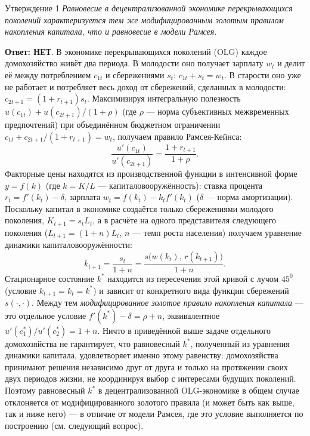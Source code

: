 \documentclass[10pt,a4paper]{article}
\newcommand{\qnet}{\textbf{\color{nored}Ответ: НЕТ}}
\newenvironment{answer}[2]{%
  \begin{qbox}{Утверждение #1}
  \textit{#2}\par\smallskip
}{%
  \end{qbox}\vspace{2pt}
}
\begin{document}
\begin{answer}{1}{Равновесие в децентрализованной экономике перекрывающихся поколений характеризуется тем же модифицированным золотым правилом накопления капитала, что и равновесие в модели Рамсея.}
\qnet. В экономике перекрывающихся поколений (OLG) каждое домохозяйство живёт два периода. В молодости оно получает зарплату $w_t$ и делит её между потреблением $c_{1t}$ и сбережениями $s_t$: $c_{1t}+s_t=w_t$. В старости оно уже не работает и потребляет весь доход от сбережений, сделанных в молодости: $c_{2t+1}=(1+r_{t+1})s_t$. Максимизируя интегральную полезность $u(c_{1t})+u(c_{2t+1})/(1+\rho)$ (где $\rho$ — норма субъективных межвременных предпочтений) при объединённом бюджетном ограничении $c_{1t}+c_{2t+1}/(1+r_{t+1})=w_t$, получаем правило Рамсея-Кейнса:
\[
\frac{u'(c_{1t})}{u'(c_{2t+1})}=\frac{1+r_{t+1}}{1+\rho}.
\]
Факторные цены находятся из производственной функции в интенсивной форме $y=f(k)$ (где $k=K/L$ — капиталовооружённость): ставка процента $r_t=f'(k_t)-\delta$, зарплата $w_t=f(k_t)-k_tf'(k_t)$ ($\delta$ — норма амортизации). Поскольку капитал в экономике создаётся только сбережениями молодого поколения, $K_{t+1}=s_tL_t$, а в расчёте на одного представителя следующего поколения ($L_{t+1}=(1+n)L_t$, $n$ — темп роста населения) получаем уравнение динамики капиталовооружённости:
\[
k_{t+1}=\frac{s_t}{1+n}=\frac{s\bigl(w(k_t),\,r(k_{t+1})\bigr)}{1+n}.
\]
Стационарное состояние $k^{*}$ находится из пересечения этой кривой с лучом $45^{0}$ (условие $k_{t+1}=k_t=k^{*}$) и зависит от конкретного вида функции сбережений $s(\cdot,\cdot)$. Между тем \emph{модифицированное золотое правило накопления капитала} — это отдельное условие $f'(k^{*})-\delta=\rho+n$, эквивалентное $u'(c_1^{*})/u'(c_2^{*})=1+n$. Ничто в приведённой выше задаче отдельного домохозяйства не гарантирует, что равновесный $k^{*}$, полученный из уравнения динамики капитала, удовлетворяет именно этому равенству: домохозяйства принимают решения независимо друг от друга и только на протяжении своих двух периодов жизни, не координируя выбор с интересами будущих поколений. Поэтому равновесный $k^{*}$ в децентрализованной OLG-экономике в общем случае отклоняется от модифицированного золотого правила (и может быть как выше, так и ниже него) — в отличие от модели Рамсея, где это условие выполняется по построению (см. следующий вопрос).
\end{answer}
 
\end{document}
